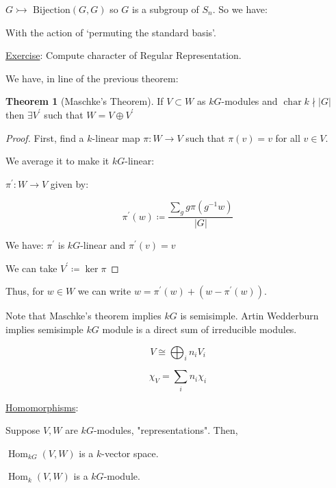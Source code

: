 \documentclass{article}
\theoremstyle{definition}
\newtheorem{theorem}{Theorem}
\newcommand{\Hom}{\operatorname{Hom}}
\newcommand{\Char}{\operatorname{char}}
\begin{document}
\(G \rightarrowtail \text{ Bijection}(G,G)\) so \(G\) is a subgroup of \(S_n\). So we have:

\begin{center}
\end{center}

With the action of `permuting the standard basis'.

\underline{Exercise}: Compute character of Regular Representation.

We have, in line of the previous theorem:

\begin{theorem}
    [Maschke's Theorem] If \(V \subset W\) as \(kG\)-modules and \(\Char k \nmid \vert G \vert\) then \(\exists V^{\prime}\) such that \(W = V \oplus V^{\prime}\) 
\end{theorem}

\begin{proof}
    First, find a \(k\)-linear map \(\pi : W \to V\) such that \(\pi (v) = v\) for all \(v\in V\).

    We average it to make it \(kG\)-linear:

    \(\pi ^{\prime} : W \to V\) given by:

    \[
        \pi ^{\prime} (w) \coloneqq \frac{\sum_{g} g \pi (g ^{-1} w)}{\vert G \vert }
    \]

    We have: \(\pi ^{\prime} \) is \(kG\)-linear and \(\pi ^{\prime} (v)=v\) 

    We can take \(V^{\prime} \coloneqq \ker\pi\) 
\end{proof}

Thus, for \(w\in W\) we can write \(w = \pi ^{\prime} (w) + (w-\pi^{\prime} (w))\).

Note that Maschke's theorem implies \(kG\) is semisimple. Artin Wedderburn implies semisimple \(kG\) module is a direct sum of irreducible modules.

\[
    V \cong \bigoplus_{i} n_i V_i
\]

\[
    \chi_V = \sum_{i} n_i \chi_i
\]

\underline{Homomorphisms}:

Suppose \(V,W\) are \(kG\)-modules, "representations". Then,

\(\Hom_{kG}(V,W)\) is a \(k\)-vector space.

\(\Hom_k(V,W)\) is a \(kG\)-module.
\end{document}
